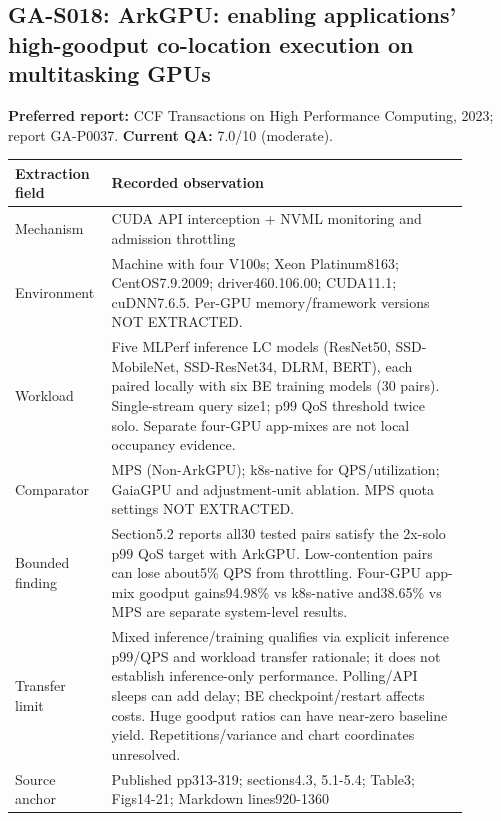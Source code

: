 \subsection{GA-S018: ArkGPU: enabling applications' high-goodput co-location execution on multitasking GPUs}
\textbf{Preferred report:} CCF Transactions on High Performance Computing, 2023; report GA-P0037. \textbf{Current QA:} 7.0/10 (moderate).
\begin{longtable}{P{0.15\linewidth}P{0.75\linewidth}}
\toprule Extraction field & Recorded observation\\\midrule\endhead
Mechanism & CUDA API interception + NVML monitoring and admission throttling\\
Environment & Machine with four V100s; Xeon Platinum8163; CentOS7.9.2009; driver460.106.00; CUDA11.1; cuDNN7.6.5. Per-GPU memory/framework versions NOT EXTRACTED.\\
Workload & Five MLPerf inference LC models (ResNet50, SSD-MobileNet, SSD-ResNet34, DLRM, BERT), each paired locally with six BE training models (30 pairs). Single-stream query size1; p99 QoS threshold twice solo. Separate four-GPU app-mixes are not local occupancy evidence.\\
Comparator & MPS (Non-ArkGPU); k8s-native for QPS/utilization; GaiaGPU and adjustment-unit ablation. MPS quota settings NOT EXTRACTED.\\
Bounded finding & Section5.2 reports all30 tested pairs satisfy the 2x-solo p99 QoS target with ArkGPU. Low-contention pairs can lose about5\% QPS from throttling. Four-GPU app-mix goodput gains94.98\% vs k8s-native and38.65\% vs MPS are separate system-level results.\\
Transfer limit & Mixed inference/training qualifies via explicit inference p99/QPS and workload transfer rationale; it does not establish inference-only performance. Polling/API sleeps can add delay; BE checkpoint/restart affects costs. Huge goodput ratios can have near-zero baseline yield. Repetitions/variance and chart coordinates unresolved.\\
Source anchor & Published pp313-319; sections4.3, 5.1-5.4; Table3; Figs14-21; Markdown lines920-1360\\
\bottomrule\end{longtable}
